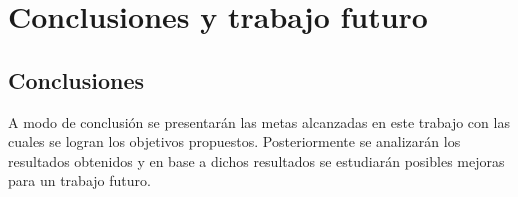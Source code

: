 \documentclass[twoside, 11pt]{epstfg}
\begin{document}
%
%
%
%
%
%
%
%






\chapter{Conclusiones y trabajo futuro}
\label{chap:conclusiones}
\vspace{-0.2cm}

\section{Conclusiones}
A modo de conclusión se presentarán las metas alcanzadas en este trabajo con las cuales se logran los objetivos propuestos. Posteriormente se analizarán los resultados obtenidos y en base a dichos resultados se estudiarán posibles mejoras para un trabajo futuro.
\end{document}
